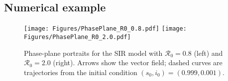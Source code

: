 \documentclass[11pt]{article}
\newcommand{\RR}{\mathcal{R}_0}
\begin{document}
\subsection*{Numerical example}
\begin{figure}[H]
\centering
\texttt{[image: Figures/PhasePlane\_R0\_0.8.pdf]}
\texttt{[image: Figures/PhasePlane\_R0\_2.0.pdf]}
\caption{Phase-plane portraits for the SIR model
with $\RR=0.8$ (left) and $\RR=2.0$ (right).
Arrows show the vector field; dashed curves are trajectories
from the initial condition $(s_0,i_0)=(0.999,0.001)$.}
\label{fig:phaseplane}
\end{figure}


\end{document}
